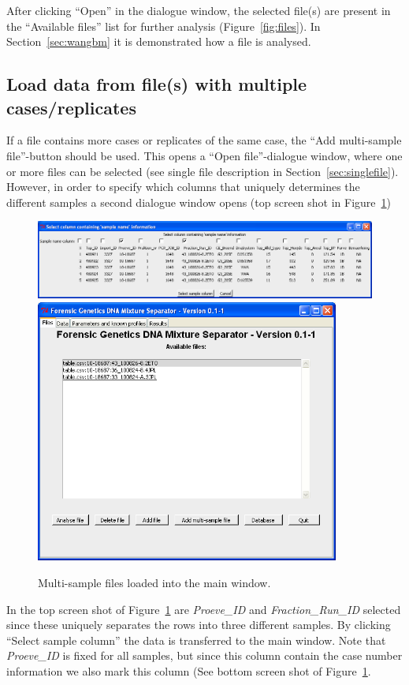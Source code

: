 \documentclass[a4paper,11pt]{article}
\begin{document}
After clicking ``Open'' in the dialogue window, the selected file(s) are
present in the ``Available files'' list for further analysis
(Figure~\ref{fig:files}). In Section~\ref{sec:wangbm} it is demonstrated
how a file is analysed.

\subsection{Load data from file(s) with multiple cases/replicates}
\label{sec:multifile}

If a file contains more cases or replicates of the same case, the
``Add multi-sample file''-button should be used. This opens a ``Open
file''-dialogue window, where one or more files can be selected (see
single file description in Section~\ref{sec:singlefile}). However, in
order to specify which columns that uniquely determines the different
samples a second dialogue window opens (top screen shot in
Figure~\ref{fig:multifiles})

\begin{figure}[!h]
  \centering
  \includegraphics[width=15cm]{multisample}\\\vskip3mm  
  \includegraphics[width=10cm]{files_multisample}
  \caption{\label{fig:multifiles}Multi-sample files loaded into the
    main window.}
\end{figure}

In the top screen shot of Figure~\ref{fig:multifiles} are
\textsl{Proeve\_ID} and \textsl{Fraction\_Run\_ID} selected since
these uniquely separates the rows into three different samples. By
clicking ``Select sample column'' the data is transferred to the main
window. Note that \textsl{Proeve\_ID} is fixed for all samples, but
since this column contain the case number information we also mark
this column (See bottom screen shot of Figure~\ref{fig:multifiles}.
\end{document}
